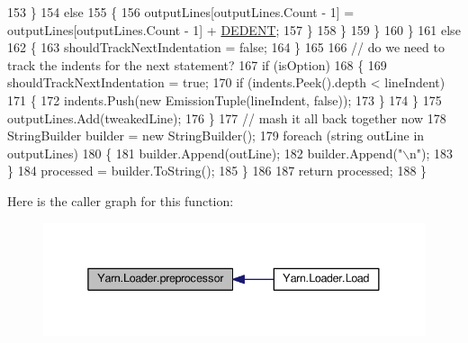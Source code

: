 \begin{DoxyCode}
153                                 \}
154                                 \textcolor{keywordflow}{else}
155                                 \{
156                                     outputLines[outputLines.Count - 1] = outputLines[outputLines.Count - 1]
       + \hyperlink{a00321_a83653c3e52fa74614e655a91ad2b7181}{DEDENT};
157                                 \}
158                             \}
159                         \}
160                     \}
161                     \textcolor{keywordflow}{else}
162                     \{
163                         shouldTrackNextIndentation = \textcolor{keyword}{false};
164                     \}
165 
166                     \textcolor{comment}{// do we need to track the indents for the next statement?}
167                     \textcolor{keywordflow}{if} (isOption)
168                     \{
169                         shouldTrackNextIndentation = \textcolor{keyword}{true};
170                         \textcolor{keywordflow}{if} (indents.Peek().depth < lineIndent)
171                         \{
172                             indents.Push(\textcolor{keyword}{new} EmissionTuple(lineIndent, \textcolor{keyword}{false}));
173                         \}
174                     \}
175                     outputLines.Add(tweakedLine);
176                 \}
177                 \textcolor{comment}{// mash it all back together now}
178                 StringBuilder builder = \textcolor{keyword}{new} StringBuilder();
179                 \textcolor{keywordflow}{foreach} (\textcolor{keywordtype}{string} outLine \textcolor{keywordflow}{in} outputLines)
180                 \{
181                     builder.Append(outLine);
182                     builder.Append(\textcolor{stringliteral}{"\(\backslash\)n"});
183                 \}
184                 processed = builder.ToString();
185             \}
186 
187             \textcolor{keywordflow}{return} processed;
188         \}
\end{DoxyCode}


Here is the caller graph for this function\-:
\nopagebreak
\begin{figure}[H]
\begin{center}
\leavevmode
\includegraphics[width=338pt]{a00125_a0b09a29edd2ed13d52203f1b71a47081_icgraph}
\end{center}
\end{figure}





